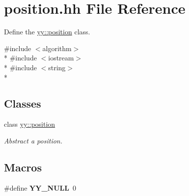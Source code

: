 \hypertarget{position_8hh}{\section{position.\-hh File Reference}
\label{position_8hh}
}


Define the \hyperlink{classyy_1_1position}{yy\-::position} class.  


{\ttfamily \#include $<$algorithm$>$}\\*
{\ttfamily \#include $<$iostream$>$}\\*
{\ttfamily \#include $<$string$>$}\\*
\subsection*{Classes}
\begin{DoxyCompactItemize}
\item 
class \hyperlink{classyy_1_1position}{yy\-::position}
\begin{DoxyCompactList}\small\item\em Abstract a position. \end{DoxyCompactList}\end{DoxyCompactItemize}
\subsection*{Macros}
\begin{DoxyCompactItemize}
\item 
\hypertarget{position_8hh_a8e0bcf8f8a5b613ea583347f8bc31cbf}{\#define {\bfseries Y\-Y\-\_\-\-N\-U\-L\-L}~0}\label{position_8hh_a8e0bcf8f8a5b613ea583347f8bc31cbf}

\end{DoxyCompactItemize}
